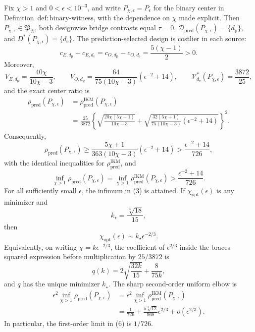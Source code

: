 Fix \(\chi>1\) and \(0<\epsilon<10^{-3}\), and write \(P_{\chi,\epsilon}=P_\epsilon\) for the binary center in Definition~\(\mathrm{def{:}binary\text{-}witness}\), with the dependence on \(\chi\) made explicit. Then \(P_{\chi,\epsilon}\in\mathfrak P_{\mathcal D}\), both designwise bridge contrasts equal \(\tau=0\), \(\mathcal D_{\mathrm{pred}}(P_{\chi,\epsilon})=\{d_{\mathrm p}\}\), and \(D^*(P_{\chi,\epsilon})=\{d_{\mathrm e}\}\). The prediction-selected design is costlier in each source:
\[
 c_{E,d_{\mathrm p}}-c_{E,d_{\mathrm e}}
 =c_{O,d_{\mathrm p}}-c_{O,d_{\mathrm e}}
 =\frac{5(\chi-1)}2>0.
\]
Moreover,
\[
 V_{E,d_{\mathrm p}}=\frac{40\chi}{10\chi-3},
 \qquad
 V_{O,d_{\mathrm p}}
 =\frac{64}{75(10\chi-3)}\left(\epsilon^{-2}+14\right),
 \qquad
 \mathcal V_{d_{\mathrm e}}^*(P_{\chi,\epsilon})=\frac{3872}{25},
\]
and the exact center ratio is
\[
\begin{aligned}
 \rho_{\mathrm{pred}}(P_{\chi,\epsilon})
 &=\rho_{\mathrm{pred}}^{\mathrm{IKM}}(P_{\chi,\epsilon})\\
 &=\frac{25}{3872}
 \left\{
 \sqrt{\frac{20\chi(5\chi-1)}{10\chi-3}}
 +\sqrt{\frac{32(5\chi+1)}{75(10\chi-3)}
 \left(\epsilon^{-2}+14\right)}
 \right\}^{2}.                                             \tag{1}
\end{aligned}
\]
Consequently,
\[
 \rho_{\mathrm{pred}}(P_{\chi,\epsilon})
 \ge
 \frac{5\chi+1}{363(10\chi-3)}
 \left(\epsilon^{-2}+14\right)
 >\frac{\epsilon^{-2}+14}{726},                            \tag{2}
\]
with the identical inequalities for \(\rho_{\mathrm{pred}}^{\mathrm{IKM}}\), and
\[
 \inf_{\chi>1}\rho_{\mathrm{pred}}(P_{\chi,\epsilon})
 =\inf_{\chi>1}\rho_{\mathrm{pred}}^{\mathrm{IKM}}(P_{\chi,\epsilon})
 >\frac{\epsilon^{-2}+14}{726}.                            \tag{3}
\]
For all sufficiently small \(\epsilon\), the infimum in (3) is attained. If \(\chi_{\mathrm{opt}}(\epsilon)\) is any minimizer and
\[
 k_\star=\frac{\sqrt[3]{18}}{15},
\]
then
\[
 \chi_{\mathrm{opt}}(\epsilon)
 \sim k_\star\epsilon^{-2/3}.                              \tag{4}
\]
Equivalently, on writing \(\chi=k\epsilon^{-2/3}\), the coefficient of \(\epsilon^{2/3}\) inside the braces-squared expression before multiplication by \(25/3872\) is
\[
 q(k)=2\sqrt{\frac{32k}{15}}+\frac{8}{75k},                \tag{5}
\]
and \(q\) has the unique minimizer \(k_\star\). The sharp second-order uniform elbow is
\[
\begin{aligned}
 \epsilon^2\inf_{\chi>1}\rho_{\mathrm{pred}}(P_{\chi,\epsilon})
 &=\epsilon^2\inf_{\chi>1}\rho_{\mathrm{pred}}^{\mathrm{IKM}}(P_{\chi,\epsilon})\\
 &=\frac1{726}+\frac{5\sqrt[3]{12}}{968}\epsilon^{2/3}
 +o(\epsilon^{2/3}).                                      \tag{6}
\end{aligned}
\]
In particular, the first-order limit in (6) is \(1/726\).